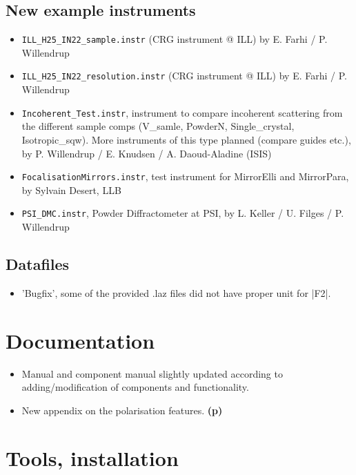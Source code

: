 \subsection{New example instruments}
\begin{itemize}
\item \verb+ILL_H25_IN22_sample.instr+ (CRG instrument @ ILL) by E. Farhi / P. Willendrup
\item \verb+ILL_H25_IN22_resolution.instr+ (CRG instrument @ ILL) by E. Farhi / P. Willendrup
\item \verb+Incoherent_Test.instr+, instrument to compare incoherent scattering from the different sample comps
     (V\_samle, PowderN, Single\_crystal, Isotropic\_sqw). More instruments of this type planned (compare
     guides etc.), by P. Willendrup / E. Knudsen / A. Daoud-Aladine (ISIS)
\item \verb+FocalisationMirrors.instr+,  test instrument for
  MirrorElli and MirrorPara, by  Sylvain Desert, LLB
\item \verb+PSI_DMC.instr+, Powder Diffractometer at PSI, by L. Keller / U. Filges / P. Willendrup
\end{itemize}
\subsection{Datafiles}
\begin{itemize}
\item 'Bugfix', some of the provided .laz files did not have proper unit for |F2|.
\end{itemize}

\section{Documentation}
\label{s:new-features:documentation}
\begin{itemize}
\item Manual and component manual slightly updated according to
  adding/modification of components and functionality.
\item New appendix on the polarisation features. {\bf(p)}
\end{itemize}

\section{Tools, installation}
\label{s:new-features:tools}
